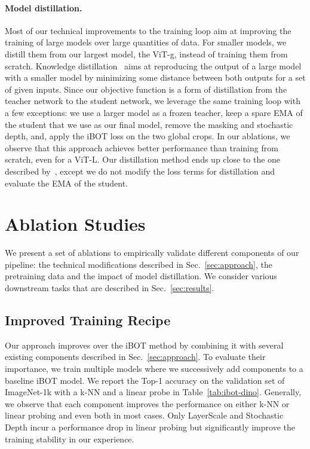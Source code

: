 \paragraph{Model distillation.}
\label{sec:distill}
Most of our technical improvements to the training loop aim at improving the training of large models over large quantities of data. For smaller models, we distill them from our largest model, the ViT-g, instead of training them from scratch. Knowledge distillation~\citep{hinton2015distilling} aims at reproducing the output of a large model with a smaller model by minimizing some distance between both outputs for a set of given inputs. Since our objective function is a form of distillation from the teacher network to the student network, we leverage the same training loop with a few exceptions: we use a larger model as a frozen teacher, keep a spare EMA of the student that we use as our final model, remove the masking and stochastic depth, and, apply the iBOT loss on the two global crops. In our ablations, we observe that this approach achieves better performance than training from scratch, even for a ViT-L. Our distillation method ends up close to the one described by~\cite{duval2023simple}, except we do not modify the loss terms for distillation and evaluate the EMA of the student.

\section{Ablation Studies} We present a set of ablations to empirically validate different components of our pipeline: the technical modifications described in Sec.~\ref{sec:approach}, the pretraining data and the impact of model distillation. We consider various downstream tasks that are described in Sec.~\ref{sec:results}.

\subsection{Improved Training Recipe}
\label{sec:ablation-ibot}
Our approach improves over the iBOT method by combining it with several existing components described in Sec.~\ref{sec:approach}.
To evaluate their importance, we train multiple models where we successively add components to a baseline iBOT model. We report the Top-1 accuracy on the validation set of ImageNet-1k with a k-NN and a linear probe in Table~\ref{tab:ibot-dino}. 
Generally, we observe that each component improves the performance on either k-NN or linear probing and even both in most cases. Only LayerScale and Stochastic Depth incur a performance drop in linear probing but significantly improve the training stability in our experience.


